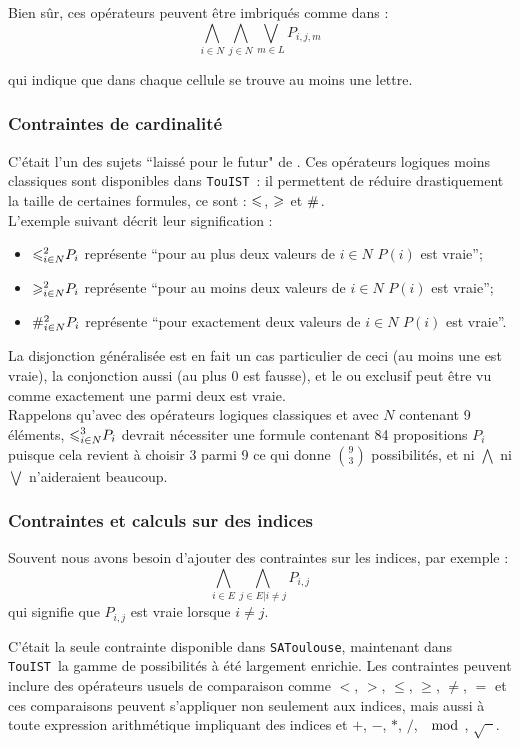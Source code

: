 \documentclass{iaf}
\newcommand{\satoulouse}{{\sc Satoulouse}\xspace}
\newcommand{\atL}[2]{{\Large \geqslant}_{#1}^{#2}}
\newcommand{\atM}[2]{{\Large \leqslant}_{#1}^{#2}}
\newcommand{\exact}[2]{{\Large \#}_{#1}^{#2}}
\renewcommand{\satoulouse}{{\sc \texttt {SAToulouse}}}
\newcommand{\nameTool}{{\sc \texttt {TouIST}}}
\begin{document}
Bien s\^ur, ces op\'erateurs peuvent \^etre imbriqu\'es comme dans :
$$\bigwedge_{i \in N} \bigwedge_{j \in N}\bigvee_{ m\in L}P_{i,j,m}$$

qui indique que dans chaque cellule se trouve au moins une lettre.


\subsubsection*{Contraintes de cardinalit\'e}
C'\'etait l'un des sujets ``laiss\'e pour le futur" de \cite{GaScSt2011}.
Ces op\'erateurs logiques moins classiques sont disponibles dans \nameTool\ : il permettent de r\'eduire drastiquement la taille de certaines formules, ce sont : $\atM{}{}$, $\atL{}{}$ et $\exact{}{}$.\\ L'exemple suivant d\'ecrit leur signification :
\begin{itemize}
\item $\atM{i \in N}{2} P_i$ repr\'esente ``pour au plus deux valeurs de $i \in N$ $P(i)$ est vraie'';
\item $\atL{i \in N}{2} P_i$ repr\'esente ``pour au moins deux valeurs de $i \in N$ $P(i)$ est vraie'';
\item $\exact{i \in N}{2} P_i$ repr\'esente ``pour exactement deux valeurs de $i \in N$ $P(i)$ est vraie''.
\end{itemize}
La disjonction g\'en\'eralis\'ee est en fait un cas particulier de ceci (au moins une est vraie), la conjonction aussi (au plus 0 est fausse), et le ou exclusif peut \^etre vu comme exactement une parmi deux est vraie. \\
Rappelons qu'avec des op\'erateurs logiques classiques et avec $N$ contenant 9 \'el\'ements, $\atM{i \in N}{3} P_i$ devrait n\'ecessiter une formule contenant 84 propositions $P_i$ puisque cela revient \`a choisir 3 parmi 9 ce qui donne $\binom{9}{3}$ possibilit\'es, et ni $\bigwedge$ ni $\bigvee$ n'aideraient beaucoup. 

\subsubsection*{Contraintes et calculs sur des indices}

Souvent nous avons besoin d'ajouter des contraintes sur les indices, par exemple :
$$\bigwedge_{i \in E } \bigwedge_{j \in E  | i \neq j}P_{i,j}$$
qui signifie que $P_{i,j}$ est vraie lorsque $i\neq j$. 

C'\'etait la seule contrainte disponible dans \satoulouse, maintenant dans \nameTool\ la gamme de possibilit\'es \`a \'et\'e largement enrichie. Les contraintes peuvent inclure des op\'erateurs usuels de comparaison comme $<$, $>$, $\leq$, $\geq$, $\neq$, $=$ et ces comparaisons peuvent s'appliquer non seulement aux indices, mais aussi \`a toute expression arithm\'etique impliquant des indices et $+$, $-$, $*$, $/$, $\mod$, $\sqrt{\phantom{x}}$. 
\end{document}
